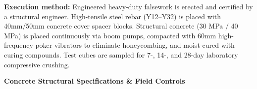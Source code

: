 \noindent
\begin{minipage}[t]{0.185\textwidth}\end{minipage}\hfill
\begin{minipage}[t]{0.185\textwidth}\end{minipage}\hfill
\begin{minipage}[t]{0.185\textwidth}\end{minipage}\hfill
\begin{minipage}[t]{0.185\textwidth}\end{minipage}\hfill
\begin{minipage}[t]{0.185\textwidth}\end{minipage}

\vspace{0.20cm}

\noindent
\begin{tcolorbox}[enhanced, colback=mhoffwhite, colframe=mhlightgray, boxrule=0.7pt, arc=4pt, left=9pt, right=9pt, top=7pt, bottom=7pt, borderline west={3pt}{0pt}{mhgold}, drop shadow=black!4]
    {\fontsize{8.1pt}{11.0pt}\selectfont\color{mhtext}
    \textbf{Execution method:} Engineered heavy-duty falsework is erected and certified by a structural engineer. High-tensile steel rebar (Y12--Y32) is placed with 40mm/50mm concrete cover spacer blocks. Structural concrete (30 MPa / 40 MPa) is placed continuously via boom pumps, compacted with 60mm high-frequency poker vibrators to eliminate honeycombing, and moist-cured with curing compounds. Test cubes are sampled for 7-, 14-, and 28-day laboratory compressive crushing.
    }
\end{tcolorbox}

\vfill

\noindent
{\large\bfseries\color{mhnavy} Concrete Structural Specifications \& Field Controls}
\vspace{0.10cm}

